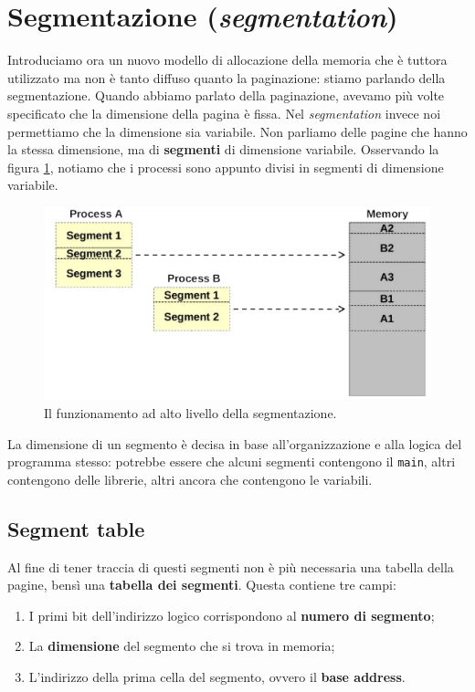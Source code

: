 % 
\section{Segmentazione (\textit{segmentation})}
Introduciamo ora un nuovo modello di allocazione della memoria che è tuttora utilizzato ma non è tanto diffuso quanto la paginazione: stiamo parlando della segmentazione. Quando abbiamo parlato della paginazione, avevamo più volte specificato che la dimensione della pagina è fissa. Nel \textit{segmentation} invece noi permettiamo che la dimensione sia variabile. Non parliamo delle pagine che hanno la stessa dimensione, ma di \textbf{segmenti} di dimensione variabile. Osservando la figura \ref{fig:segmentation}, notiamo che i processi sono appunto divisi in segmenti di dimensione variabile.
\begin{figure}[h]
    \centering
    \includegraphics[width = .6\textwidth]{../res/imgs/main memory/segmentation.png}
    \caption{Il funzionamento ad alto livello della segmentazione.}
    \label{fig:segmentation}
\end{figure}
La dimensione di un segmento è decisa in base all'organizzazione e alla logica del programma stesso: potrebbe essere che alcuni segmenti contengono il \texttt{main}, altri contengono delle librerie, altri ancora che contengono le variabili. 

\subsection{Segment table}
Al fine di tener traccia di questi segmenti non è più necessaria una tabella della pagine, bensì una \textbf{tabella dei segmenti}. Questa contiene tre campi:
\vspace{-4px}
\begin{enumerate}
\setlength{\itemsep}{-1px}
    \item I primi bit dell'indirizzo logico corrispondono al \textbf{numero di segmento};
    \item La \textbf{dimensione} del segmento che si trova in memoria;
    \item L'indirizzo della prima cella del segmento, ovvero il \textbf{base address}.
\end{enumerate}

